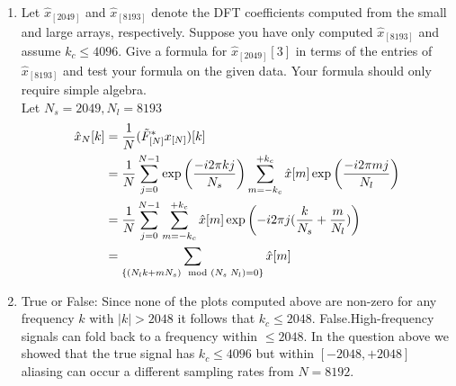 \documentclass[12pt,twoside]{article}
\begin{document}
\begin{enumerate}
\begin{enumerate}
  \item Let $\hat{x}_{[2049]}$ and $\hat{x}_{[8193]}$ denote the DFT
    coefficients computed from the small and large arrays, respectively.
    Suppose you have only computed $\hat{x}_{[8193]}$
    and assume $k_c\leq4096$.
    Give a formula for $\hat{x}_{[2049]}[3]$ in terms of
    the entries of $\hat{x}_{[8193]}$ and test your formula
    on the given data.  Your formula should only require simple algebra. \\
    Let $N_s=2049, N_l=8193$
    \begin{align*}
    	\hat{x}_{N}[k]	&=	\frac{1}{N} (\tilde{F}^*_{[N]} x_{[N]})[k] \\
				&=	\frac{1}{N} \sum_{j=0}^{N-1} \exp \left(  \frac{ - i2 \pi kj}{N_s}  \right) \sum_{m=-k_c}^{+k_c} \hat{x}[m] \exp \left(  \frac{ - i2 \pi mj}{N_l}  \right)\\		
				&=	\frac{1}{N} \sum_{j=0}^{N-1}  \sum_{m=-k_c}^{+k_c}  \hat{x}[m]  \exp \left(   - i2 \pi j (\frac{k}{N_s} + \frac{m}{N_l})  \right) \\
				&=    \sum_{\{(N_l k + m N_s) \mod (N_s \; N_l) = 0\} } \hat{x}[m] \\
    \end{align*}
    
    
  \item True or False: Since none of the plots computed above are non-zero for
    any frequency $k$ with $|k|>2048$ it follows that
    $k_c\leq2048$. %
    False.High-frequency signals can fold back to a frequency within  $\leq2048$. In the question above we showed that the true signal has 
    $k_c\leq4096$ but within  $[-2048, +2048]$ aliasing can occur a different sampling rates from $N=8192$.
    
  \end{enumerate}


\end{enumerate}
\end{document}
